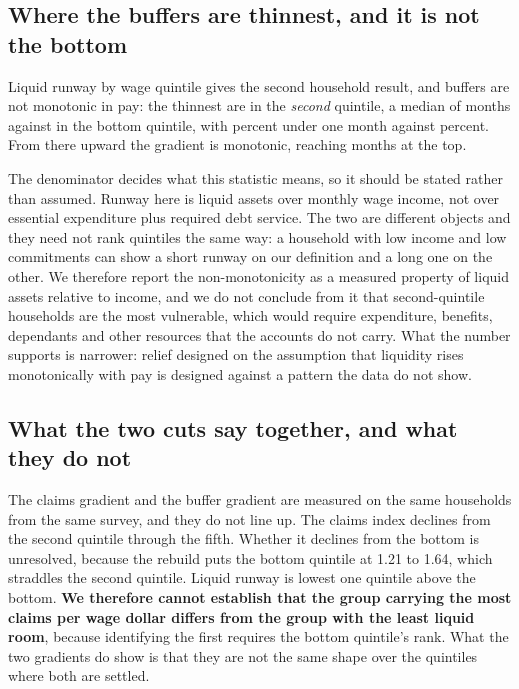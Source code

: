 \subsection{Where the buffers are thinnest, and it is not the bottom}

Liquid runway by wage quintile gives the second household result, and buffers are not monotonic
in pay: the thinnest are in the \emph{second} quintile, a median of  months
against  in the bottom quintile, with  percent under one
month against  percent. From there upward the gradient is monotonic,
reaching  months at the top.

The denominator decides what this statistic means, so it should be stated rather than assumed.
Runway here is liquid assets over monthly wage income, not over essential expenditure plus
required debt service. The two are different objects and they need not rank quintiles the same
way: a household with low income and low commitments can show a short runway on our definition
and a long one on the other. We therefore report the non-monotonicity as a measured property of
liquid assets relative to income, and we do not conclude from it that second-quintile households
are the most vulnerable, which would require expenditure, benefits, dependants and other
resources that the accounts do not carry. What the number supports is narrower: relief designed
on the assumption that liquidity rises monotonically with pay is designed against a pattern the
data do not show.

\begin{table}[htbp]
\centering
\caption{Liquid runway of working households by wage quintile: months of income covered by liquid
assets, and the share with less than one month. Measured.}
\label{tab:buffers}

\end{table}

\subsection{What the two cuts say together, and what they do not}

The claims gradient and the buffer gradient are measured on the same households from the same
survey, and they do not line up. The claims index declines from the second quintile through the
fifth. Whether it declines from the bottom is unresolved, because the rebuild puts the bottom
quintile at 1.21 to 1.64, which straddles the second quintile. Liquid runway is lowest one
quintile above the bottom. \textbf{We therefore cannot establish that the group carrying the most
claims per wage dollar differs from the group with the least liquid room}, because identifying
the first requires the bottom quintile's rank. What the two gradients do show is that they are
not the same shape over the quintiles where both are settled.

